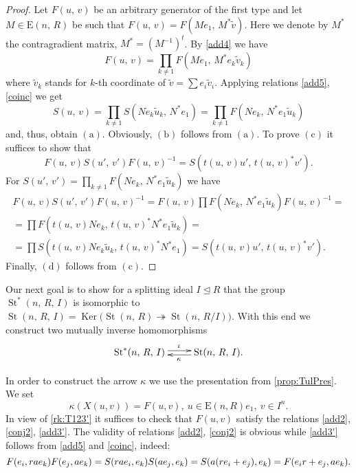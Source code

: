 \documentclass[11pt]{amsart}
\theoremstyle{plain} \declaretheorem[name=Theorem, Refname={Theorem,Theorems}]{tm} \Crefname{tm}{Theorem}{Theorems}
\numberwithin{equation}{section}
\theoremstyle{definition} \newtheorem{df}[lm]{Definition} \Crefname{df}{Definition}{Definitions}
\theoremstyle{remark} \newtheorem{rk}[lm]{Remark} \Crefname{rk}{Remark}{Remarks}
\newcommand{\Ker}{\mathop{\mathrm{Ker}}\nolimits}
\newcommand{\E}{{\mathrm{E}}}
\newcommand{\St}{\mathop{\mathrm{St}}\nolimits}
\newcommand{\epi}{\twoheadrightarrow}
\newcommand{\inv}{^{-1}}
\begin{document}
\begin{proof}
Let $F(u,\,v)$ be an arbitrary generator of the first type and let $M\in\E(n,\,R)$ be such that $F(u,\,v)=F(Me_1,\,M^*\tilde v)$. 
Here we denote by $M^*$ the contragradient matrix, $M^*=(M\inv)^t$. 
By \eqref{add4} we have $$F(u,\,v)=\prod\limits_{k\neq1}F(Me_1,\,M^*e_k\tilde v_k)$$
where $\tilde v_k$ stands for $k$-th coordinate of $\tilde v=\sum e_i\tilde v_i$.
Applying relations \eqref{add5}, \eqref{coinc} we get
$$S(u,\,v)=\prod\limits_{k\neq1}S(Ne_k\tilde u_k,\,N^*e_1)=\prod\limits_{k\neq1}F(Ne_k,\,N^*e_1\tilde u_k)$$
and, thus, obtain $(\mathrm{a})$. Obviously, $(\mathrm{b})$ follows from $(\mathrm{a})$. 
To prove $(\mathrm{c})$ it suffices to show that
$$F(u,\,v)S(u',\,v')F(u,\,v)\inv=S(t(u,\,v)u',\,t(u,\,v)^*v').$$
For $S(u',\,v')=\prod_{k\neq 1} F(Ne_k,\,N^*e_1\tilde u_k)$ we have
\begin{multline*}
F(u,\,v)S(u',\,v')F(u,\,v)\inv=F(u,\,v)\prod F(Ne_k,\,N^*e_1\tilde u_k)F(u,\,v)\inv=\\
=\prod F(t(u,\,v)Ne_k,\,t(u,\,v)^*N^*e_1\tilde u_k)=\\
=\prod S(t(u,\,v)Ne_k\tilde u_k,\,t(u,\,v)^*N^*e_1)=S(t(u,\,v)u',\,t(u,\,v)^*v').
\end{multline*}
Finally, $(\mathrm{d})$ follows from $(\mathrm{c})$.
\end{proof}

Our next goal is to show for a splitting ideal $I\trianglelefteq R$ that the group $\St^*(n,\,R,\,I)$ is isomorphic to $\St(n,\,R,\,I)=\Ker\big(\St(n,\,R)\epi\St(n,\,R/I)\big)$.
With this end we construct two mutually inverse homomorphisms
$$\xymatrix{\St^*(n,\,R,\,I)\ar@<0.5ex>[r]^{\iota}&\St(n,\,R,\,I)\ar@<0.5ex>[l]^{\kappa}.}$$

In order to construct the arrow $\kappa$ we use the presentation from \cref{prop:TulPres}.
We set $$\kappa(X(u,v)) = F(u,v),\ u\in \E(n, R)e_1,\ v\in I^n.$$ 
In view of \cref{rk:T123'} it suffices to check that $F(u,v)$ satisfy the relations \eqref{add2}, \eqref{conj2}, \eqref{add3'}.
The validity of relations \eqref{add2}, \eqref{conj2} is obvious while \eqref{add3'} follows from \eqref{add5} and \eqref{coinc}, indeed:
$$ F(e_i, rae_k) F(e_j, ae_k) = S(rae_i, e_k) S(ae_j, e_k) = S(a(re_i+e_j), e_k) = F(e_ir+e_j, ae_k). \qedhere $$
\end{document}
